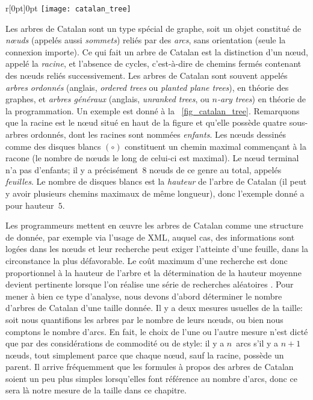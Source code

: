 %
\begin{wrapfigure}[9]{r}[0pt]{0pt}
\centering
\texttt{[image: catalan\_tree]}
\caption{Arbre de Catalan de hauteur~5\label{fig_catalan_tree}}
\end{wrapfigure}
Les arbres de Catalan sont un type spécial de graphe, soit un objet
constitué de \emph{n{\oe}uds} (appelés aussi \emph{sommets}) reliés
par des \emph{arcs}, sans orientation (seule la connexion importe). Ce
qui fait un arbre de Catalan est la distinction d'un n{\oe}ud, appelé
la \emph{racine}, et l'absence de cycles, c'est-à-dire de chemins
fermés contenant des n{\oe}uds reliés successivement. Les arbres de
Catalan sont souvent appelés \emph{arbres ordonnés} (anglais,
\emph{ordered trees} ou \emph{planted plane trees}), en théorie des
graphes, et \emph{arbres généraux} (anglais, \emph{unranked trees}, ou
\emph{\(n\)-ary trees}) en théorie de la programmation. Un exemple est
donné à la \fig~\ref{fig_catalan_tree}. Remarquons que la racine est
le n{\oe}ud situé en haut de la figure et qu'elle possède quatre
sous-arbres ordonnés, dont les racines sont nommées
\emph{enfants}. Les n{\oe}uds dessinés comme des disques blancs
\((\circ)\) constituent un chemin maximal commençant à la racone (le
nombre de n{\oe}uds le long de celui-ci est maximal). Le n{\oe}ud
terminal n'a pas d'enfants; il y a précisément~\(8\) n{\oe}uds de ce
genre au total, appelés \emph{feuilles}. Le nombre de disques blancs
est la \emph{hauteur} de l'arbre de Catalan (il peut y avoir plusieurs
chemins maximaux de même longueur), donc l'exemple donné a pour
hauteur~\(5\).

Les programmeurs mettent en {\oe}uvre les arbres de Catalan comme une
structure de donnée, par exemple via l'usage de \textsf{XML}, auquel
cas, des informations sont logées dans les n{\oe}uds et leur recherche
peut exiger l'atteinte d'une feuille, dans la circonstance la plus
défavorable. Le coût maximum d'une recherche est donc proportionnel à
la hauteur de l'arbre et la détermination de la hauteur moyenne
devient pertinente lorsque l'on réalise une série de recherches
aléatoires \citep{VitterFlajolet_1990}. Pour mener à bien ce type
d'analyse, nous devons d'abord déterminer le nombre d'arbres de
Catalan d'une taille donnée. Il y a deux mesures usuelles de la
taille: soit nous quantifions les arbres par le nombre de leurs
n{\oe}uds, ou bien nous comptons le nombre d'arcs. En fait, le choix
de l'une ou l'autre mesure n'est dicté que par des considérations de commodité ou de style: il y a \(n\)~arcs s'il y a \(n+1\) n{\oe}uds, tout simplement parce que chaque n{\oe}ud, sauf la racine, possède un parent. Il arrive fréquemment que les formules à propos des arbres de Catalan soient un peu plus simples lorsqu'elles font référence au nombre d'arcs, donc ce sera là notre mesure de la taille dans ce chapitre.

